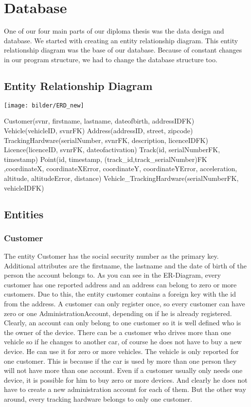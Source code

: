 \chapter{Database}
One of our four main parts of our diploma thesis was the data design and database. We started with creating an entity relationship diagram. This entity relationship diagram was the base of our database. Because of constant changes in our program structure, we had to change the database structure too. 
\section{Entity Relationship Diagram}
\begin{center}
\texttt{[image: bilder/ERD\_new]}
\end{center} 
Customer(svnr, firstname, lastname, dateofbirth, addressIDFK)\newline
Vehicle(vehicleID, svnrFK)\newline
Address(addressID, street, zipcode)\newline
TrackingHardware(serialNumber, svnrFK, description, licenceIDFK)\newline
Licence(licenceID, svnrFK, dateofactivation)\newline
Track(id, serialNumberFK, timestamp)\newline
Point(id, timestamp, (track\_id,track\_serialNumber)FK ,coordinateX, coordinateXError, coordinateY, coordinateYError, acceleration, altitude, altitudeError, distance)\newline
Vehicle\_TrackingHardware(serialNumberFK, vehicleIDFK)
\section{Entities}
\subsection{Customer}
The entity Customer has the social security number as the primary key. Additional attributes are the firstname, the lastname and the date of birth of the person the account belongs to. As you can see in the ER-Diagram, every customer has one reported address and an address can belong to zero or more customers. Due to this, the entity customer contains a foreign key with the id from the address. A customer can only register once, so every customer can have zero or one AdministrationAccount, depending on if he is already registered. Clearly, an account can only belong to one customer so it is well defined who is the owner of the device. There can be a customer who drives more than one vehicle so if he changes to another car, of course he does not have to buy a new device. He can use it for zero or more vehicles. The vehicle is only reported for one customer. This is because if the car is used by more than one person they will not have more than one account. Even if a customer usually only needs one device, it is possible for him to buy zero or more devices. And clearly he does not have to create a new administration account for each of them. But the other way around, every tracking hardware belongs to only one customer.
